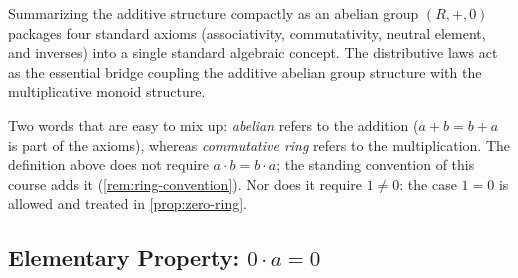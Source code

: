 \begin{content}
\begin{steps}
Summarizing the additive structure compactly as an abelian group $(R, +, 0)$ packages four standard axioms (associativity, commutativity, neutral element, and inverses) into a single standard algebraic concept. The distributive laws act as the essential bridge coupling the additive abelian group structure with the multiplicative monoid structure.

Two words that are easy to mix up: \emph{abelian} refers to the addition ($a + b = b + a$ is part of the axioms), whereas \emph{commutative ring} refers to the multiplication. The definition above does not require $a \cdot b = b \cdot a$; the standing convention of this course adds it (\cref{rem:ring-convention}). Nor does it require $1 \neq 0$: the case $1 = 0$ is allowed and treated in \cref{prop:zero-ring}.
\end{steps}
\end{content}

\subsection{Elementary Property: \texorpdfstring{$0 \cdot a = 0$}{0 * a = 0}}

